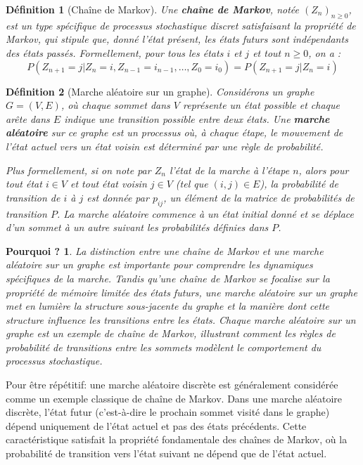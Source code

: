 \documentclass{article}
\theoremstyle{pasdepoint}
\newtheorem{definition}{Définition}
\theoremstyle{break}
\theoremstyle{pasdepoint}
\newtheorem*{pourquoi}{Pourquoi ?}
\begin{document}
\begin{definition}[Chaîne de Markov]
    Une \textbf{chaîne de Markov}, notée $(Z_n)_{n \geq 0}$, est un type spécifique de processus stochastique discret satisfaisant la propriété de Markov, qui stipule que, donné l'état présent, les états futurs sont indépendants des états passés. Formellement, pour tous les états $i$ et $j$ et tout $n \geq 0$, on a :
    \[
    P(Z_{n+1} = j | Z_n = i, Z_{n-1} = i_{n-1}, \ldots, Z_0 = i_0) = P(Z_{n+1} = j | Z_n = i)
    \]
\end{definition}

\begin{definition}[Marche aléatoire sur un graphe]
    Considérons un graphe $G = (V, E)$, où chaque sommet dans $V$ représente un état possible et chaque arête dans $E$ indique une transition possible entre deux états. Une \textbf{marche aléatoire} sur ce graphe est un processus où, à chaque étape, le mouvement de l'état actuel vers un état voisin est déterminé par une règle de probabilité. 

    Plus formellement, si on note par $Z_n$ l'état de la marche à l'étape $n$, alors pour tout état $i \in V$ et tout état voisin $j \in V$ (tel que $(i, j) \in E$), la probabilité de transition de $i$ à $j$ est donnée par $p_{ij}$, un élément de la matrice de probabilités de transition $P$. La marche aléatoire commence à un état initial donné et se déplace d'un sommet à un autre suivant les probabilités définies dans $P$.
\end{definition}

\begin{pourquoi}
    La distinction entre une chaîne de Markov et une marche aléatoire sur un graphe est importante pour comprendre les dynamiques spécifiques de la marche. Tandis qu'une chaîne de Markov se focalise sur la propriété de mémoire limitée des états futurs, une marche aléatoire sur un graphe met en lumière la structure sous-jacente du graphe et la manière dont cette structure influence les transitions entre les états. Chaque marche aléatoire sur un graphe est un exemple de chaîne de Markov, illustrant comment les règles de probabilité de transitions entre les sommets modèlent le comportement du processus stochastique.
\end{pourquoi}

Pour être répétitif: une marche aléatoire discrète est généralement considérée comme un exemple classique de chaîne de Markov. Dans une marche aléatoire discrète, l'état futur (c'est-à-dire le prochain sommet visité dans le graphe) dépend uniquement de l'état actuel et pas des états précédents. Cette caractéristique satisfait la propriété fondamentale des chaînes de Markov, où la probabilité de transition vers l'état suivant ne dépend que de l'état actuel.
\end{document}
